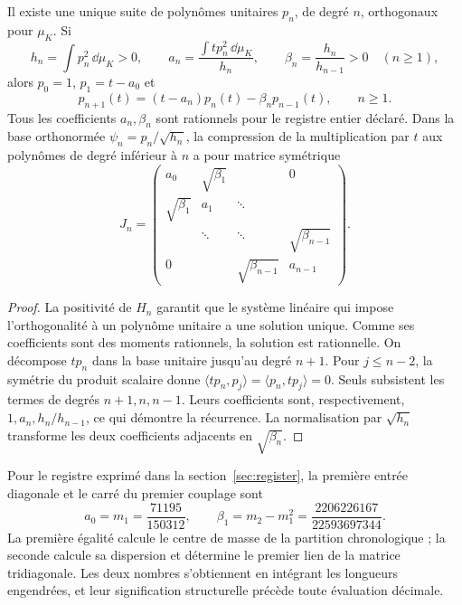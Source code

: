 \begin{theorem}
\label{thm:jacobi-recurrence}
Il existe une unique suite de polynômes unitaires \(p_n\), de degré \(n\),
orthogonaux pour \(\mu_K\). Si
\[
 h_n=\int p_n^2\,\dd\mu_K>0,\qquad
 a_n=\frac{\int t p_n^2\,\dd\mu_K}{h_n},\qquad
 \beta_n=\frac{h_n}{h_{n-1}}>0\quad(n\geq1),
\]
alors \(p_0=1\), \(p_1=t-a_0\) et
\begin{equation}
 p_{n+1}(t)=(t-a_n)p_n(t)-\beta_np_{n-1}(t),\qquad n\geq1.
 \label{eq:jacobi-recurrence}
\end{equation}
Tous les coefficients \(a_n,\beta_n\) sont rationnels pour le registre
entier déclaré. Dans la base orthonormée \(\psi_n=p_n/\sqrt{h_n}\),
la compression de la multiplication par \(t\) aux polynômes de degré
inférieur à \(n\) a pour matrice symétrique
\[
 J_n=\begin{pmatrix}
 a_0&\sqrt{\beta_1}&&0\\
 \sqrt{\beta_1}&a_1&\ddots&\\
 &\ddots&\ddots&\sqrt{\beta_{n-1}}\\
 0&&\sqrt{\beta_{n-1}}&a_{n-1}
 \end{pmatrix}.
\]
\end{theorem}
\begin{proof}
La positivité de \(H_n\) garantit que le système linéaire qui impose
l’orthogonalité à un polynôme unitaire a une solution unique. Comme ses
coefficients sont des moments rationnels, la solution est rationnelle. On
décompose \(tp_n\) dans la base unitaire jusqu’au degré \(n+1\). Pour
\(j\leq n-2\), la symétrie du produit scalaire donne
\(\langle tp_n,p_j\rangle=\langle p_n,tp_j\rangle=0\).
Seuls subsistent les termes de degrés \(n+1,n,n-1\). Leurs
coefficients sont, respectivement, \(1,a_n,h_n/h_{n-1}\), ce qui
démontre la récurrence. La normalisation par \(\sqrt{h_n}\)
transforme les deux coefficients adjacents en \(\sqrt{\beta_n}\).
\end{proof}

Pour le registre exprimé dans la section~\ref{sec:register}, la première entrée diagonale et le carré du premier couplage sont
\[
 a_0=m_1=\frac{71195}{150312},\qquad
 \beta_1=m_2-m_1^2=\frac{2206226167}{22593697344}.
\]
La première égalité calcule le centre de masse de la partition chronologique ;
la seconde calcule sa dispersion et détermine le premier lien de la
matrice tridiagonale. Les deux nombres s’obtiennent en intégrant les longueurs
engendrées, et leur signification structurelle précède toute évaluation
décimale.

